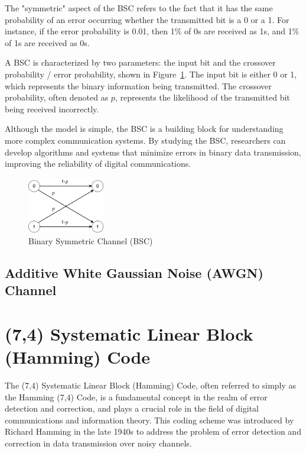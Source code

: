 \documentclass{article}
\begin{document}
The "symmetric" aspect of the BSC refers to the fact that it has the same probability of an error occurring whether the transmitted bit is a 0 or a 1. For instance, if the error probability is 0.01, then 1\% of 0s are received as 1s, and 1\% of 1s are received as 0s. 

A BSC is characterized by two parameters: the input bit and the crossover probability / error probability, shown in Figure~\ref{fig:bsc}. The input bit is either 0 or 1, which represents the binary information being transmitted. The crossover probability, often denoted as $p$, represents the likelihood of the transmitted bit being received incorrectly. 

Although the model is simple, the BSC is a building block for understanding more complex communication systems. By studying the BSC, researchers can develop algorithms and systems that minimize errors in binary data transmission, improving the reliability of digital communications.

\begin{figure}[htb]
    \centering
    \includegraphics[width=0.3\textwidth]{bsc.png}
    \caption{Binary Symmetric Channel (BSC)}
    \label{fig:bsc}
\end{figure}








\subsection{Additive White Gaussian Noise (AWGN) Channel}










\section{(7,4) Systematic Linear Block (Hamming) Code}
The (7,4) Systematic Linear Block (Hamming) Code, often referred to simply as the Hamming (7,4) Code, is a fundamental concept in the realm of error detection and correction, and plays a crucial role in the field of digital communications and information theory. This coding scheme was introduced by Richard Hamming in the late 1940s to address the problem of error detection and correction in data transmission over noisy channels.
\end{document}
